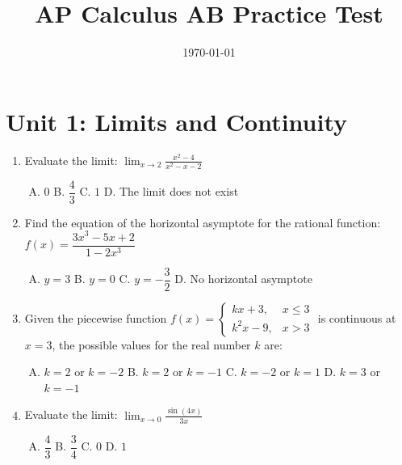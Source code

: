 \documentclass[11pt,a4paper]{article}
\title{\textbf{AP Calculus AB Practice Test }}
\date{\today}
\begin{document}
\maketitle

\thispagestyle{empty}

\newpage
{}

\section*{Unit 1: Limits and Continuity}

\begin{enumerate}[1.]
    \item Evaluate the limit: $\displaystyle \lim_{x \to 2} \frac{x^2 - 4}{x^2 - x - 2}$
    \begin{enumerate}[A.]
        \item $0$ \qquad B. $\dfrac{4}{3}$ \qquad C. $1$ \qquad D. The limit does not exist
    \end{enumerate}

    \item Find the equation of the horizontal asymptote for the rational function: $f(x) = \dfrac{3x^3 - 5x + 2}{1 - 2x^3}$
    \begin{enumerate}[A.]
        \item $y = 3$ \qquad B. $y = 0$ \qquad C. $y = -\dfrac{3}{2}$ \qquad D. No horizontal asymptote
    \end{enumerate}

    \item Given the piecewise function $f(x) = \begin{cases} 
      kx + 3, & x \le 3 \\ 
      k^2x - 9, & x > 3 
   \end{cases}$ is continuous at $x = 3$, the possible values for the real number $k$ are:
    \begin{enumerate}[A.]
        \item $k = 2$ or $k = -2$ \qquad B. $k = 2$ or $k = -1$ \qquad C. $k = -2$ or $k = 1$ \qquad D. $k = 3$ or $k = -1$
    \end{enumerate}

    \item Evaluate the limit: $\displaystyle \lim_{x \to 0} \frac{\sin(4x)}{3x}$
    \begin{enumerate}[A.]
        \item $\dfrac{4}{3}$ \qquad B. $\dfrac{3}{4}$ \qquad C. $0$ \qquad D. $1$
    \end{enumerate}


\end{enumerate}
\end{document}
